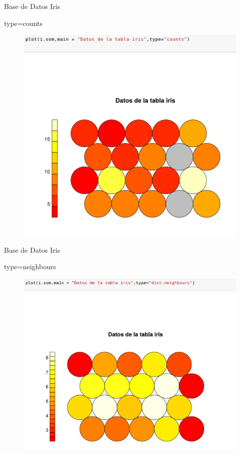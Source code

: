 \documentclass{beamer}
\begin{document}
\begin{frame}{Base de Datos Iris}
\begin{block}{type=counts}
\begin{figure}
\includegraphics[scale=0.4]{counts.png}
\centering
\end{figure}
\end{block}
\end{frame}

\begin{frame}{Base de Datos Iris}
\begin{block}{type=neighbours}
\begin{figure}
\includegraphics[scale=0.4]{neighbours.png}
\centering
\end{figure}
\end{block}
\end{frame}
\end{document}
